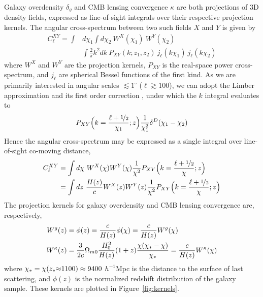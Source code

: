 \documentclass[a4paper,usenatbib]{mnras}
\begin{document}
Galaxy overdensity $\delta_g$ and CMB lensing convergence $\kappa$ are both projections of 3D density fields, expressed as line-of-sight integrals over their respective projection kernels. The angular cross-spectrum between two such fields $X$ and $Y$ is given by
\begin{align}
C_{\ell}^{XY} = \int & d\chi_1 \int d\chi_2 \ W^X(\chi_1) \ W^Y(\chi_2) \nonumber \\ & \int \frac{2}{\pi}k^2dk \ P_{XY}(k;z_1,z_2) \ j_{\ell}(k\chi_1) \ j_{\ell}(k\chi_2)
\end{align}
where $W^X$ and $W^Y$ are the projection kernels, $P_{XY}$ is the real-space power cross-spectrum, and $j_{\ell}$ are spherical Bessel functions of the first kind. As we are primarily interested in angular scales $\lesssim 1^{\circ}$ ($\ell \gtrsim 100$), we can adopt the Limber approximation \citep{Limber53, Rubin54} and its first order correction \citep{LoverdeAfshordi08}, under which the $k$ integral evaluates to
\begin{equation}
    P_{XY}{\Big (}k = \frac{\ell + 
\nicefrac{1}{2}}{\chi_1}; z{\Big )}\frac{1}{\chi_1^2}\delta^{D}(\chi_1 - \chi_2)
\end{equation}
Hence the angular cross-spectrum may be expressed as a single integral over line-of-sight co-moving distance,
\begin{align}
C_{\ell}^{XY} &= \int d\chi \ W^X(\chi) W^Y(\chi) \frac{1}{\chi^2}P_{XY}{\Big (}k = \frac{\ell + 
\nicefrac{1}{2}}{\chi}; z{\Big )} \\
&= \int dz \ \frac{H(z)}{c} W^X(z) W^Y(z) \frac{1}{\chi^2}P_{XY}{\Big (}k = \frac{\ell + 
\nicefrac{1}{2}}{\chi}; z{\Big )}
\end{align}
The projection kernels for galaxy overdensity and CMB lensing convergence are, respectively,
\begin{gather}
\begin{aligned}
    W^{g}(z) &= \phi(z) = \frac{c}{H(z)}\phi(\chi) = \frac{c}{H(z)} W^{g}(\chi) \\
    W^{\kappa}(z) &= \frac{3}{2c} \Omega_{m0} \frac{H_0^2}{H(z)} (1+z) \frac{\chi(\chi_{\rm *}-\chi)}{\chi_{\rm *}} = \frac{c}{H(z)} W^{\kappa}(\chi)
\end{aligned}
\end{gather}
where $\chi_{\rm *} = \chi(z_{\rm *}{\approx}1100) \approx 9400$ $h^{-1}$Mpc is the distance to the surface of last scattering, and $\phi(z)$ is the normalized redshift distribution of the galaxy sample. These kernels are plotted in Figure~\ref{fig:kernels}.
\end{document}
